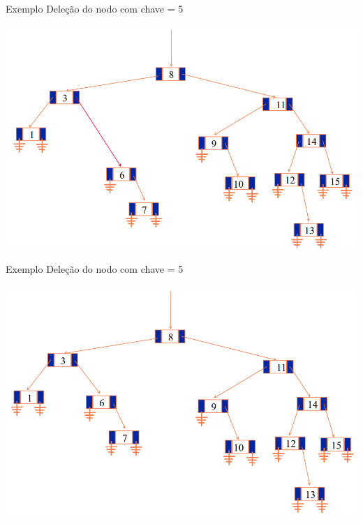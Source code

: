 \documentclass[12pt,table,xcolor={dvipsnames}]{beamer}
\begin{document}
\begin{frame}[fragile]{Exemplo}
Deleção do nodo com chave = 5
\begin{center}
\includegraphics[scale=.3]{arv11.png} 
\end{center}
\end{frame}

\begin{frame}[fragile]{Exemplo}
Deleção do nodo com chave = 5
\begin{center}
\includegraphics[scale=.3]{arv12.png} 
\end{center}
\end{frame}
\end{document}
